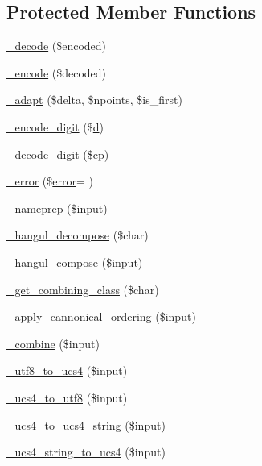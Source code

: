 \subsection*{Protected Member Functions}
\begin{DoxyCompactItemize}
\item 
\hyperlink{classidna__convert_a6e4c2f051cfd4ebd84d47c013c18205e}{\+\_\+decode} (\$encoded)
\item 
\hyperlink{classidna__convert_aa32f14e1635b5bcf8a1000721a53db8d}{\+\_\+encode} (\$decoded)
\item 
\hyperlink{classidna__convert_a521d4543ec6839af3283be4380e91a86}{\+\_\+adapt} (\$delta, \$npoints, \$is\+\_\+first)
\item 
\hyperlink{classidna__convert_afdb30c72ac13c3c71922afb63fabb37c}{\+\_\+encode\+\_\+digit} (\$\hyperlink{xpresseditor_8min_8js_aa27188e30a5d2270a230edf44af69623}{d})
\item 
\hyperlink{classidna__convert_adb87b0a6d3168899e718dff394723e96}{\+\_\+decode\+\_\+digit} (\$cp)
\item 
\hyperlink{classidna__convert_a16cb93864021e29871b9ad6716ab632c}{\+\_\+error} (\$\hyperlink{jquery_8js_ad9c7b7332a24ed93fb21cd053c99bd12}{error}= \textquotesingle{}\textquotesingle{})
\item 
\hyperlink{classidna__convert_ac73124acc2f1e772fadd64d176bfe0b9}{\+\_\+nameprep} (\$input)
\item 
\hyperlink{classidna__convert_a9cc5a89053729bb98d2a0ecf143b2b2c}{\+\_\+hangul\+\_\+decompose} (\$char)
\item 
\hyperlink{classidna__convert_a33124ab535f6739a2a5e6fa46c532d28}{\+\_\+hangul\+\_\+compose} (\$input)
\item 
\hyperlink{classidna__convert_abd868ffb75c0d7633998ab14f6621dd3}{\+\_\+get\+\_\+combining\+\_\+class} (\$char)
\item 
\hyperlink{classidna__convert_a3e0f3eceeb2987f2b69b9a3cf6f7181a}{\+\_\+apply\+\_\+cannonical\+\_\+ordering} (\$input)
\item 
\hyperlink{classidna__convert_a751b0b8bfacdc3b79eb77018a508363d}{\+\_\+combine} (\$input)
\item 
\hyperlink{classidna__convert_abafc3eb23a9da5e7b53c5f9f8b7ee035}{\+\_\+utf8\+\_\+to\+\_\+ucs4} (\$input)
\item 
\hyperlink{classidna__convert_a3827709d9c0e35a164838064f73daea5}{\+\_\+ucs4\+\_\+to\+\_\+utf8} (\$input)
\item 
\hyperlink{classidna__convert_ac353a6fccbc4e8e15e90772acb6e2a74}{\+\_\+ucs4\+\_\+to\+\_\+ucs4\+\_\+string} (\$input)
\item 
\hyperlink{classidna__convert_ac95599caba5f1a276ba1a75a12d385dd}{\+\_\+ucs4\+\_\+string\+\_\+to\+\_\+ucs4} (\$input)
\end{DoxyCompactItemize}
